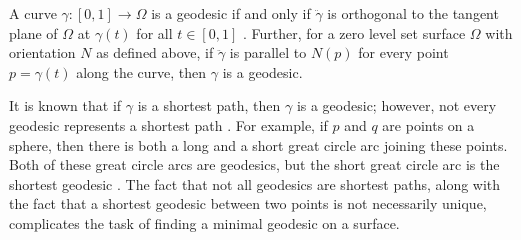 \documentclass[12pt]{amsart}
\theoremstyle{definition}
\theoremstyle{remark}
\numberwithin{equation}{section}
\numberwithin{equation}{section}
\begin{document}
A curve $\gamma:[0,1]\to \Omega$ is a geodesic if and only if $\ddot{\gamma}$ is orthogonal to the tangent plane of $\Omega$ at $\gamma(t)$ for all $t\in[0,1]$ \cite{Pressley:2001}. 
Further, for a zero level set surface $\Omega$ with orientation $N$ as defined above, if $\ddot{\gamma}$ is parallel to $N(p)$ for every point $p  = \gamma(t)$ along the curve, 
then $\gamma$ is a geodesic.  

It is known that if $\gamma$ is a shortest path, then $\gamma$ is a geodesic; however, not every geodesic represents a shortest path \cite{Pressley:2001, Crane:2020}. {For example, if $p$ and $q$ are points on a sphere, then there is both a long and a short great circle arc joining these points. Both of these great circle arcs are geodesics, but the short great circle arc is the shortest geodesic \cite{Pressley:2001}.} The fact that not all geodesics are shortest paths, along with the fact that a shortest geodesic between two points is not necessarily unique, complicates the task of finding a minimal geodesic on a surface. 
\end{document}
